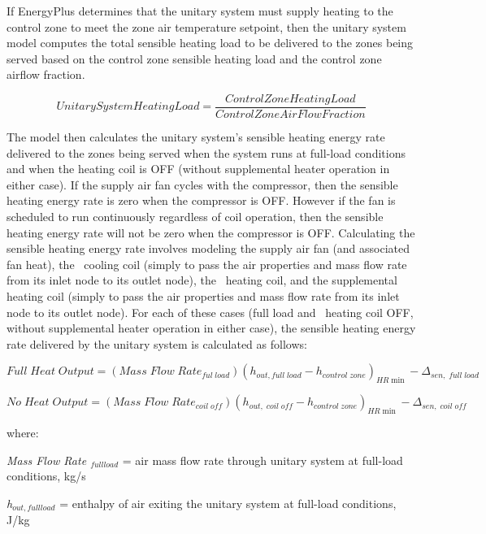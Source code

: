 If EnergyPlus determines that the unitary system must supply heating to the control zone to meet the zone air temperature setpoint, then the unitary system model computes the total sensible heating load to be delivered to the zones being served based on the control zone sensible heating load and the control zone airflow fraction.

\begin{equation}
UnitarySystemHeatingLoad = \frac{{ControlZoneHeatingLoad}}{{ControlZoneAirFlowFraction}}
\end{equation}

The model then calculates the unitary system's sensible heating energy rate delivered to the zones being served when the system runs at full-load conditions and when the heating coil is OFF (without supplemental heater operation in either case). If the supply air fan cycles with the compressor, then the sensible heating energy rate is zero when the compressor is OFF. However if the fan is scheduled to run continuously regardless of coil operation, then the sensible heating energy rate will not be zero when the compressor is OFF. Calculating the sensible heating energy rate involves modeling the supply air fan (and associated fan heat), the~ cooling coil (simply to pass the air properties and mass flow rate from its inlet node to its outlet node), the~ heating coil, and the supplemental heating coil (simply to pass the air properties and mass flow rate from its inlet node to its outlet node). For each of these cases (full load and~ heating coil OFF, without supplemental heater operation in either case), the sensible heating energy rate delivered by the unitary system is calculated as follows:

\begin{equation}
Full\;Heat\;Output = (Mass\;Flow\;Rat{e_{ful\;load}}){({h_{out,full\;load}} - {h_{control\;zone}})_{HR\min }} - {\Delta_{sen,\;full\;load}}
\end{equation}

\begin{equation}
No\;Heat\;Output = (Mass\;Flow\;Rat{e_{coil\;off}}){({h_{out,\;coil\;off}} - {h_{control\;zone}})_{HR\min }} - {\Delta_{sen,\;coil\;off}}
\end{equation}

where:

\emph{Mass Flow Rate \(_{full load}\)} = air mass flow rate through unitary system at full-load conditions, kg/s

\emph{h\(_{out, full load}\)} = enthalpy of air exiting the unitary system at full-load conditions, J/kg

